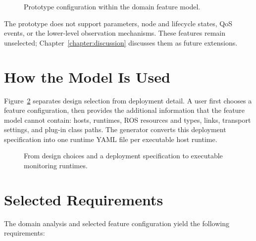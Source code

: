 \begin{figure}[htbp]
  \centering
  \resizebox{\textwidth}{!}{}
  \caption{Prototype configuration within the domain feature model.}
  \label{fig:feature-model}
\end{figure}

The prototype does not support parameters, node and lifecycle states, QoS
events, or the lower-level observation mechanisms. These features remain
unselected; Chapter~\ref{chapter:discussion} discusses them as future
extensions.

\section{How the Model Is Used}

Figure~\ref{fig:configuration-workflow} separates design selection from
deployment detail. A user first chooses a feature configuration, then
provides the additional information that the feature model cannot contain:
hosts, runtimes, ROS resources and types, links, transport settings, and
plug-in class paths. The generator converts this deployment specification into
one runtime YAML file per executable host runtime.

\begin{figure}[htbp]
  \centering
  \resizebox{\textwidth}{!}{}
  \caption{From design choices and a deployment specification to executable
  monitoring runtimes.}
  \label{fig:configuration-workflow}
\end{figure}

\section{Selected Requirements}

The domain analysis and selected feature configuration yield the following
requirements:

